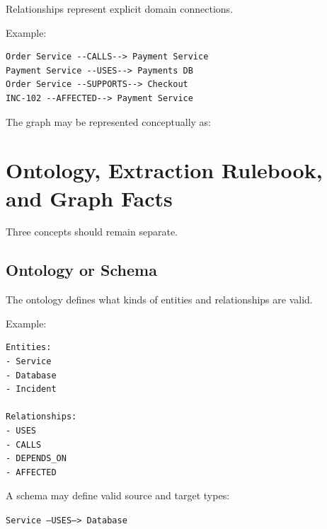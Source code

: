 \documentclass[11pt,a4paper]{article}
\begin{document}
Relationships represent explicit domain connections.

Example:

\begin{lstlisting}
Order Service --CALLS--> Payment Service
Payment Service --USES--> Payments DB
Order Service --SUPPORTS--> Checkout
INC-102 --AFFECTED--> Payment Service
\end{lstlisting}

The graph may be represented conceptually as:

\begin{center}
\end{center}

\section{Ontology, Extraction Rulebook, and Graph Facts}

Three concepts should remain separate.

\subsection{Ontology or Schema}

The ontology defines what kinds of entities and relationships are valid.

Example:

\begin{lstlisting}
Entities:
- Service
- Database
- Incident

Relationships:
- USES
- CALLS
- DEPENDS_ON
- AFFECTED
\end{lstlisting}

A schema may define valid source and target types:

\begin{center}
\texttt{Service --USES--> Database}
\end{center}
\end{document}
